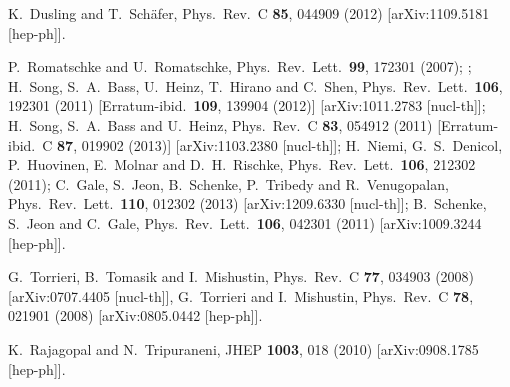 \begin{thebibliography}{99}
  K.~Dusling and T.~Sch\"afer,
  Phys.\ Rev.\ C {\bf 85}, 044909 (2012)
  [arXiv:1109.5181 [hep-ph]].
  
  P.~Romatschke and U.~Romatschke,
  Phys.\ Rev.\ Lett.\  {\bf 99}, 172301 (2007); 
  ; H.~Song, S.~A.~Bass, U.~Heinz, T.~Hirano and C.~Shen,
  Phys.\ Rev.\ Lett.\  {\bf 106}, 192301 (2011)
  [Erratum-ibid.\  {\bf 109}, 139904 (2012)]
  [arXiv:1011.2783 [nucl-th]]; H.~Song, S.~A.~Bass and U.~Heinz,
  Phys.\ Rev.\ C {\bf 83}, 054912 (2011)
  [Erratum-ibid.\ C {\bf 87}, 019902 (2013)]
  [arXiv:1103.2380 [nucl-th]]; H.~Niemi, G.~S.~Denicol, P.~Huovinen, E.~Molnar and D.~H.~Rischke,
  Phys.\ Rev.\ Lett.\  {\bf 106}, 212302 (2011); C.~Gale, S.~Jeon, B.~Schenke, P.~Tribedy and R.~Venugopalan,
  Phys.\ Rev.\ Lett.\  {\bf 110}, 012302 (2013)
  [arXiv:1209.6330 [nucl-th]];  B.~Schenke, S.~Jeon and C.~Gale,
  Phys.\ Rev.\ Lett.\  {\bf 106}, 042301 (2011)
  [arXiv:1009.3244 [hep-ph]].
  
  G.~Torrieri, B.~Tomasik and I.~Mishustin,
  Phys.\ Rev.\ C {\bf 77}, 034903 (2008)
  [arXiv:0707.4405 [nucl-th]], G.~Torrieri and I.~Mishustin,
  Phys.\ Rev.\ C {\bf 78}, 021901 (2008)
  [arXiv:0805.0442 [hep-ph]].

  K.~Rajagopal and N.~Tripuraneni,
  JHEP {\bf 1003}, 018 (2010)
  [arXiv:0908.1785 [hep-ph]].
  

\end{thebibliography}
